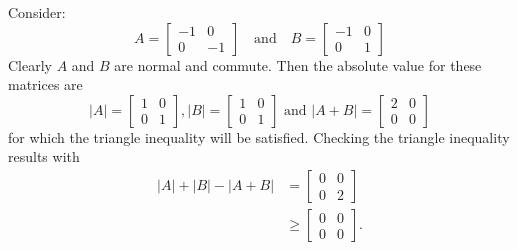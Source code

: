 \begin{example}
    Consider: 
    $$
    A = \begin{bmatrix}
        -1 & 0 \\ 0 & -1
    \end{bmatrix} \quad
    \text{and} \quad
    B = \begin{bmatrix}
        -1 & 0 \\ 0 & 1
    \end{bmatrix}
    $$
    Clearly $A$ and $B$ are normal and commute. Then the absolute value for these matrices are 
    $$
    |A| = \begin{bmatrix} 1 & 0 \\ 0 & 1 \end{bmatrix},
    |B| =  \begin{bmatrix} 1 & 0 \\ 0 & 1 \end{bmatrix} \text{ and }
    |A+B| =  \begin{bmatrix} 2 & 0 \\ 0 & 0 \end{bmatrix}
    $$
    for which the triangle inequality will be satisfied. Checking the triangle inequality results with
    \begin{align*}
        |A|+|B|-|A+B| &= 
            \begin{bmatrix}
                 0 & 0 \\ 0 & 2 
            \end{bmatrix}\\
        &\geq
        \begin{bmatrix}
            0 & 0 \\ 0 & 0
        \end{bmatrix}.
    \end{align*}
\end{example}

